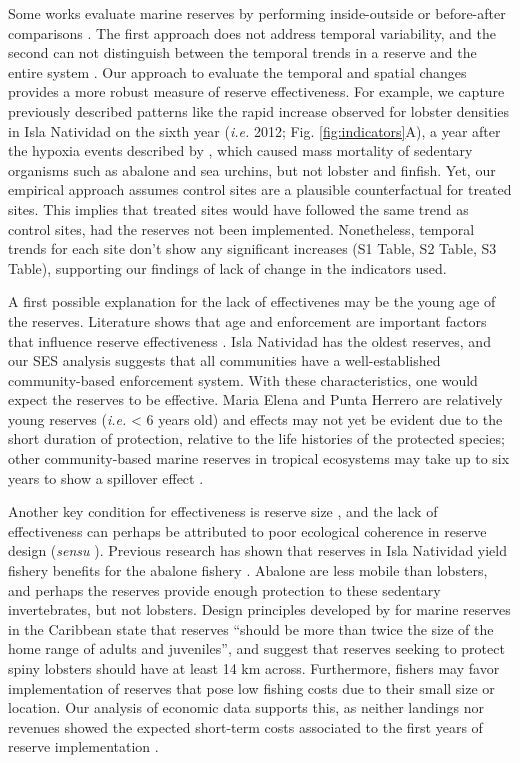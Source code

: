 \documentclass{frontiersSCNS}
\begin{document}
Some works evaluate marine reserves by performing inside-outside
\citep{guidetti_2014-8Z,friedlander_2017-oI,rodriguez_2017-PD} or
before-after comparisons \citep{betti_2017-lq}. The first approach does
not address temporal variability, and the second can not distinguish
between the temporal trends in a reserve and the entire system
\citep{depalma_2018}. Our approach to evaluate the temporal and spatial
changes provides a more robust measure of reserve effectiveness. For
example, we capture previously described patterns like the rapid
increase observed for lobster densities in Isla Natividad on the sixth
year (\emph{i.e.} 2012; Fig. \ref{fig:indicators}A), a year after the
hypoxia events described by \citet{micheli_2012-EU}, which caused mass
mortality of sedentary organisms such as abalone and sea urchins, but
not lobster and finfish. Yet, our empirical approach assumes control
sites are a plausible counterfactual for treated sites. This implies
that treated sites would have followed the same trend as control sites,
had the reserves not been implemented. Nonetheless, temporal trends for
each site don't show any significant increases (S1 Table, S2 Table, S3
Table), supporting our findings of lack of change in the indicators
used.

A first possible explanation for the lack of effectivenes may be the
young age of the reserves. Literature shows that age and enforcement are
important factors that influence reserve effectiveness
\citep{edgar_2014-UO,babcock_2010}. Isla Natividad has the oldest
reserves, and our SES analysis suggests that all communities have a
well-established community-based enforcement system. With these
characteristics, one would expect the reserves to be effective. Maria
Elena and Punta Herrero are relatively young reserves (\emph{i.e.}
\textless{} 6 years old) and effects may not yet be evident due to the
short duration of protection, relative to the life histories of the
protected species; other community-based marine reserves in tropical
ecosystems may take up to six years to show a spillover effect
\citep{dasilva_2015-zX}.

Another key condition for effectiveness is reserve size
\citep{edgar_2014-UO}, and the lack of effectiveness can perhaps be
attributed to poor ecological coherence in reserve design (\emph{sensu}
\citet{rees_2018}). Previous research has shown that reserves in Isla
Natividad yield fishery benefits for the abalone fishery
\citep{rossetto_2015-V0}. Abalone are less mobile than lobsters, and
perhaps the reserves provide enough protection to these sedentary
invertebrates, but not lobsters. Design principles developed by
\citet{green_2017} for marine reserves in the Caribbean state that
reserves ``should be more than twice the size of the home range of
adults and juveniles'', and suggest that reserves seeking to protect
spiny lobsters should have at least 14 km across. Furthermore, fishers
may favor implementation of reserves that pose low fishing costs due to
their small size or location. Our analysis of economic data supports
this, as neither landings nor revenues showed the expected short-term
costs associated to the first years of reserve implementation
\citep{ovando_2016-Wg}.
\end{document}
